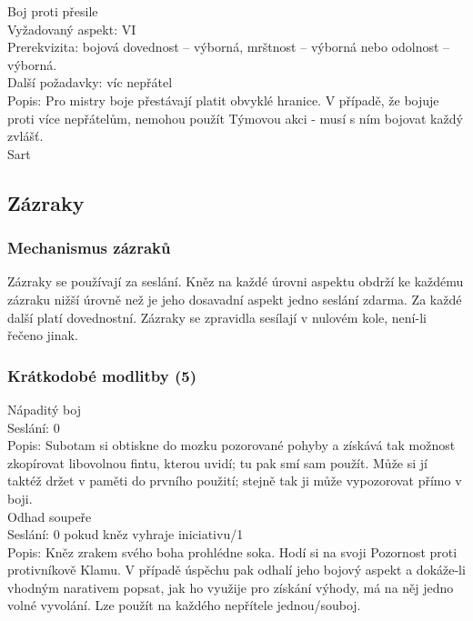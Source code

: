 \documentclass[../main.tex]{subfiles}
\begin{document}
Boj proti přesile\\
Vyžadovaný aspekt: VI\\
Prerekvizita: bojová dovednost – výborná, mrštnost – výborná nebo odolnost – výborná.\\
Další požadavky: víc nepřátel\\
Popis: Pro mistry boje přestávají platit obvyklé hranice. V případě, že bojuje proti více nepřátelům, nemohou použít Týmovou akci - musí s ním bojovat každý zvlášť.\\


Sart\\


\subsection{Zázraky}
\label{sec:subotam-zazraky}

\subsubsection{Mechanismus zázraků}
Zázraky se používají za seslání. Kněz na každé úrovni aspektu obdrží ke každému zázraku nižší úrovně než je jeho dosavadní aspekt jedno seslání zdarma. Za každé další platí dovednostní.  Zázraky se zpravidla sesílají v nulovém kole, není-li řečeno jinak.

\subsubsection{Krátkodobé modlitby (5)}

Nápaditý boj\\
Seslání: 0\\
Popis: Subotam si obtiskne do  mozku pozorované pohyby a  získává tak  možnost zkopírovat libovolnou fintu, kterou uvidí; tu pak smí sam použít. Může si jí taktéž držet v paměti do prvního použití; stejně tak ji může vypozorovat přímo v boji.\\


Odhad soupeře\\
Seslání: 0 pokud kněz vyhraje iniciativu/1\\
Popis: Kněz zrakem svého boha prohlédne soka. Hodí si na svoji Pozornost proti protivníkově Klamu. V případě úspěchu pak odhalí jeho bojový aspekt a dokáže-li vhodným narativem popsat, jak ho využije pro získání výhody, má na něj jedno volné vyvolání. Lze použít na každého nepřítele jednou/souboj. \\
\end{document}
